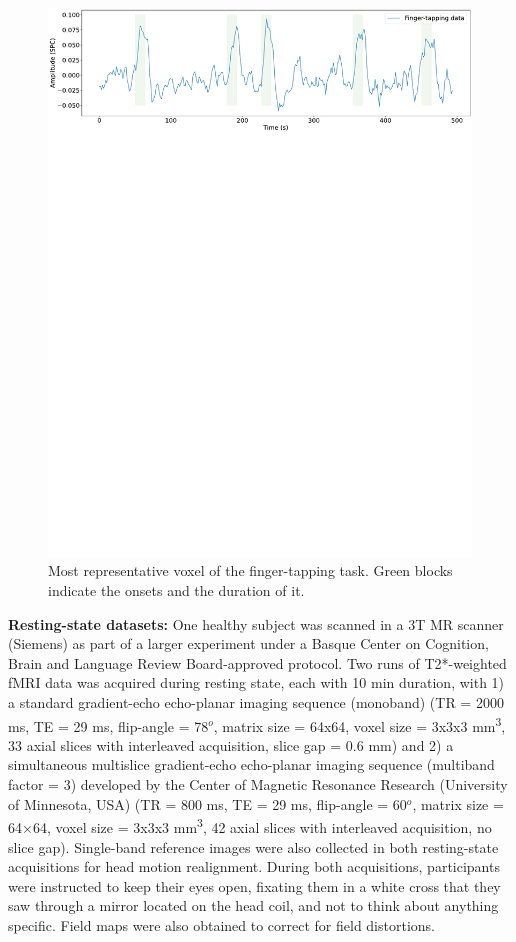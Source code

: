 \begin{figure}[h]
    \begin{center}
        \includegraphics[width=\columnwidth]{figures/finger_tapping.pdf}
    \end{center}
    \caption{Most representative voxel of the finger-tapping task. Green blocks indicate the onsets and the duration of it.}
\label{fig:finger_tapping}
\end{figure}

\textbf{Resting-state datasets:} One healthy subject was scanned in a 3T MR scanner (Siemens) as part of a larger experiment under a Basque Center on Cognition, Brain and Language Review Board-approved protocol. Two runs of T2*-weighted fMRI data was acquired during resting state, each with 10 min duration, with 1) a standard gradient-echo echo-planar imaging sequence (monoband) (TR = 2000 ms, TE = 29 ms, flip-angle = 78\(^o\), matrix size = 64x64, voxel size = 3x3x3 mm\textsuperscript{3}, 33 axial slices with interleaved acquisition, slice gap = 0.6 mm) and 2) a simultaneous multislice gradient-echo echo-planar imaging sequence (multiband factor = 3) developed by the Center of Magnetic Resonance Research (University of Minnesota, USA) (TR = 800 ms, TE = 29 ms, flip-angle = 60\(^o\), matrix size = 64×64, voxel size = 3x3x3 mm\textsuperscript{3}, 42 axial slices with interleaved acquisition, no slice gap). Single-band reference images were also collected in both resting-state acquisitions for head motion realignment. During both acquisitions, participants were instructed to keep their eyes open, fixating them in a white cross that they saw through a mirror located on the head coil, and not to think about anything specific. Field maps were also obtained to correct for field distortions.

